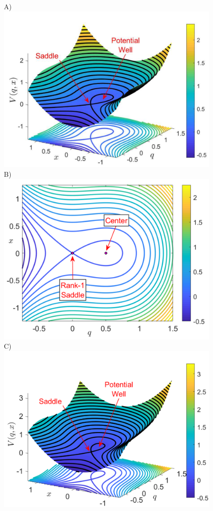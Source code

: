 \documentclass{ws-ijbc}
\begin{document}
\begin{figure}[htbp]
	\begin{center}
	A)\includegraphics[scale=0.31]{fig5a}
	B)\includegraphics[scale=0.29]{fig5b}
	C)\includegraphics[scale=0.31]{fig5c}

\end{center}
\end{figure}
\end{document}
